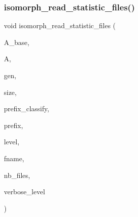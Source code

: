 \subsubsection{\texorpdfstring{isomorph\+\_\+read\+\_\+statistic\+\_\+files()}{isomorph\_read\_statistic\_files()}}
{\footnotesize\ttfamily void isomorph\+\_\+read\+\_\+statistic\+\_\+files (\begin{DoxyParamCaption}\item[{\mbox{\hyperlink{classaction}{action}} $\ast$}]{A\+\_\+base,  }\item[{\mbox{\hyperlink{classaction}{action}} $\ast$}]{A,  }\item[{\mbox{\hyperlink{classgenerator}{generator}} $\ast$}]{gen,  }\item[{\mbox{\hyperlink{galois_8h_a09fddde158a3a20bd2dcadb609de11dc}{I\+NT}}}]{size,  }\item[{const \mbox{\hyperlink{galois_8h_ab6cc7b4aeb6ea31aba2b3fbfc83ff5e6}{B\+Y\+TE}} $\ast$}]{prefix\+\_\+classify,  }\item[{const \mbox{\hyperlink{galois_8h_ab6cc7b4aeb6ea31aba2b3fbfc83ff5e6}{B\+Y\+TE}} $\ast$}]{prefix,  }\item[{\mbox{\hyperlink{galois_8h_a09fddde158a3a20bd2dcadb609de11dc}{I\+NT}}}]{level,  }\item[{const \mbox{\hyperlink{galois_8h_ab6cc7b4aeb6ea31aba2b3fbfc83ff5e6}{B\+Y\+TE}} $\ast$$\ast$}]{fname,  }\item[{\mbox{\hyperlink{galois_8h_a09fddde158a3a20bd2dcadb609de11dc}{I\+NT}}}]{nb\+\_\+files,  }\item[{\mbox{\hyperlink{galois_8h_a09fddde158a3a20bd2dcadb609de11dc}{I\+NT}}}]{verbose\+\_\+level }\end{DoxyParamCaption})}

\mbox{\label{isomorph__global_8_c_abe3bbbcc72eeed292e953c313dbdb314}} 
